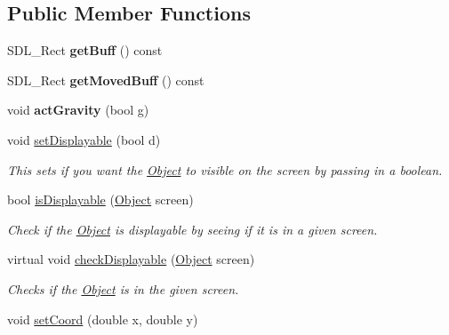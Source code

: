 \subsection*{Public Member Functions}
\begin{DoxyCompactItemize}
\item 
S\+D\+L\+\_\+\+Rect {\bfseries get\+Buff} () const \hypertarget{classObject_ae5e6be999e5cb182b99ffe3ef66a5906}{}\label{classObject_ae5e6be999e5cb182b99ffe3ef66a5906}

\item 
S\+D\+L\+\_\+\+Rect {\bfseries get\+Moved\+Buff} () const \hypertarget{classObject_a28d93def802fa59dbcfc53cf78156135}{}\label{classObject_a28d93def802fa59dbcfc53cf78156135}

\item 
void {\bfseries act\+Gravity} (bool g)\hypertarget{classObject_a0678f7d75772473c00aaf196448d7f09}{}\label{classObject_a0678f7d75772473c00aaf196448d7f09}

\item 
void \hyperlink{classObject_a6eb461900d28eba30ba6dbdb02284900}{set\+Displayable} (bool d)\hypertarget{classObject_a6eb461900d28eba30ba6dbdb02284900}{}\label{classObject_a6eb461900d28eba30ba6dbdb02284900}

\begin{DoxyCompactList}\small\item\em This sets if you want the \hyperlink{classObject}{Object} to visible on the screen by passing in a boolean. \end{DoxyCompactList}\item 
bool \hyperlink{classObject_a382084d25dd4e5c98d441c91e0ae6ec2}{is\+Displayable} (\hyperlink{classObject}{Object} screen)\hypertarget{classObject_a382084d25dd4e5c98d441c91e0ae6ec2}{}\label{classObject_a382084d25dd4e5c98d441c91e0ae6ec2}

\begin{DoxyCompactList}\small\item\em Check if the \hyperlink{classObject}{Object} is displayable by seeing if it is in a given screen. \end{DoxyCompactList}\item 
virtual void \hyperlink{classObject_afae907cba88dfbfcfd7b730349d7cb60}{check\+Displayable} (\hyperlink{classObject}{Object} screen)\hypertarget{classObject_afae907cba88dfbfcfd7b730349d7cb60}{}\label{classObject_afae907cba88dfbfcfd7b730349d7cb60}

\begin{DoxyCompactList}\small\item\em Checks if the \hyperlink{classObject}{Object} is in the given screen. \end{DoxyCompactList}\item 
void \hyperlink{classObject_a2095a5a402443ff9602f699dc76c2762}{set\+Coord} (double x, double y)\hypertarget{classObject_a2095a5a402443ff9602f699dc76c2762}{}\label{classObject_a2095a5a402443ff9602f699dc76c2762}


\end{DoxyCompactItemize}
